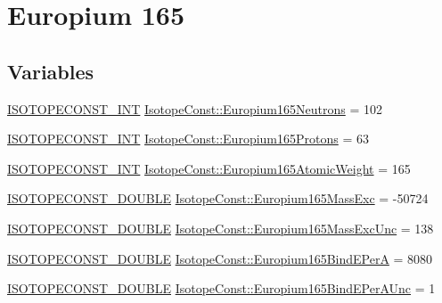 \hypertarget{group___isotope_const-_europium-_eu165}{}\section{Europium 165}
\label{group___isotope_const-_europium-_eu165}
\subsection*{Variables}
\begin{DoxyCompactItemize}
\item 
\mbox{\hyperlink{group___isotope_const-_macros_ga5f18360b3e99483a35c32d789e62621c}{I\+S\+O\+T\+O\+P\+E\+C\+O\+N\+S\+T\+\_\+\+I\+NT}} \mbox{\hyperlink{group___isotope_const-_europium-_eu165_gad3c410e8501a32bac7a25a7dbd363062}{Isotope\+Const\+::\+Europium165\+Neutrons}} = 102
\item 
\mbox{\hyperlink{group___isotope_const-_macros_ga5f18360b3e99483a35c32d789e62621c}{I\+S\+O\+T\+O\+P\+E\+C\+O\+N\+S\+T\+\_\+\+I\+NT}} \mbox{\hyperlink{group___isotope_const-_europium-_eu165_gab34be72ba3e7c7387286e3d188befaf9}{Isotope\+Const\+::\+Europium165\+Protons}} = 63
\item 
\mbox{\hyperlink{group___isotope_const-_macros_ga5f18360b3e99483a35c32d789e62621c}{I\+S\+O\+T\+O\+P\+E\+C\+O\+N\+S\+T\+\_\+\+I\+NT}} \mbox{\hyperlink{group___isotope_const-_europium-_eu165_ga6cdf8fa14f73a296321b93494ad4b990}{Isotope\+Const\+::\+Europium165\+Atomic\+Weight}} = 165
\item 
\mbox{\hyperlink{group___isotope_const-_macros_ga8f45a7272ce02c0b4c65c44636ed719a}{I\+S\+O\+T\+O\+P\+E\+C\+O\+N\+S\+T\+\_\+\+D\+O\+U\+B\+LE}} \mbox{\hyperlink{group___isotope_const-_europium-_eu165_ga2dbd42ebcc47ecc71bbb0db741685c79}{Isotope\+Const\+::\+Europium165\+Mass\+Exc}} = -\/50724
\item 
\mbox{\hyperlink{group___isotope_const-_macros_ga8f45a7272ce02c0b4c65c44636ed719a}{I\+S\+O\+T\+O\+P\+E\+C\+O\+N\+S\+T\+\_\+\+D\+O\+U\+B\+LE}} \mbox{\hyperlink{group___isotope_const-_europium-_eu165_gaa9136af598e420465dbe84a68523022c}{Isotope\+Const\+::\+Europium165\+Mass\+Exc\+Unc}} = 138
\item 
\mbox{\hyperlink{group___isotope_const-_macros_ga8f45a7272ce02c0b4c65c44636ed719a}{I\+S\+O\+T\+O\+P\+E\+C\+O\+N\+S\+T\+\_\+\+D\+O\+U\+B\+LE}} \mbox{\hyperlink{group___isotope_const-_europium-_eu165_gad2dee9c79a654bb8a42c249014b854fa}{Isotope\+Const\+::\+Europium165\+Bind\+E\+PerA}} = 8080
\item 
\mbox{\hyperlink{group___isotope_const-_macros_ga8f45a7272ce02c0b4c65c44636ed719a}{I\+S\+O\+T\+O\+P\+E\+C\+O\+N\+S\+T\+\_\+\+D\+O\+U\+B\+LE}} \mbox{\hyperlink{group___isotope_const-_europium-_eu165_gad79924fe350bd9b5360c2a046d5d69bc}{Isotope\+Const\+::\+Europium165\+Bind\+E\+Per\+A\+Unc}} = 1

\end{DoxyCompactItemize}
